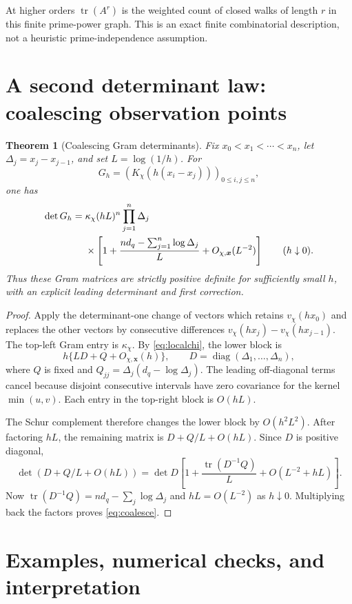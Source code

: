 \documentclass[11pt]{article}
\newtheorem{theorem}{Theorem}[section]
\theoremstyle{definition}
\newcommand{\tr}{\operatorname{tr}}
\newcommand{\diag}{\operatorname{diag}}
\newcommand{\kap}{\kappa}
\begin{document}
At higher orders $\tr(A^r)$ is the weighted count of closed walks of length
$r$ in this finite prime-power graph. This is an exact finite combinatorial
description, not a heuristic prime-independence assumption.

\section{A second determinant law: coalescing observation points}

\begin{theorem}[Coalescing Gram determinants]\label{thm:coalesce}
Fix $x_0<x_1<\cdots<x_n$, let $\Delta_j=x_j-x_{j-1}$, and set
$L=\log(1/h)$. For
\[
 G_h=(K_\chi(h(x_i-x_j)))_{0\le i,j\le n},
\]
one has
\begin{align}\label{eq:coalesce}
 \det G_h
 ={}&\kap_\chi(hL)^n\prod_{j=1}^n\Delta_j\notag\\
 &\times\left[1+
   \frac{n d_q-\sum_{j=1}^n\log\Delta_j}{L}
   +O_{\chi,\bm x}(L^{-2})\right]
 \qquad(h\downarrow0).
\end{align}
Thus these Gram matrices are strictly positive definite for sufficiently
small $h$, with an explicit leading determinant and first correction.
\end{theorem}

\begin{proof}
Apply the determinant-one change of vectors which retains $v_\chi(hx_0)$
and replaces the other vectors by consecutive differences
$v_\chi(hx_j)-v_\chi(hx_{j-1})$. The top-left Gram entry is $\kap_\chi$.
By \cref{eq:localchi}, the lower block is
\[
 h\{LD+Q+O_{\chi,\bm x}(h)\},\qquad
 D=\diag(\Delta_1,\ldots,\Delta_n),
\]
where $Q$ is fixed and
$Q_{jj}=\Delta_j(d_q-\log\Delta_j)$. The leading off-diagonal terms cancel
because disjoint consecutive intervals have zero covariance for the kernel
$\min(u,v)$. Each entry in the top-right block is $O(hL)$.

The Schur complement therefore changes the lower block by $O(h^2L^2)$.
After factoring $hL$, the remaining matrix is
$D+Q/L+O(hL)$. Since $D$ is positive diagonal,
\[
 \det(D+Q/L+O(hL))
 =\det D\left[1+\frac{\tr(D^{-1}Q)}L
              +O(L^{-2}+hL)\right].
\]
Now $\tr(D^{-1}Q)=nd_q-\sum_j\log\Delta_j$ and $hL=O(L^{-2})$ as
$h\downarrow0$. Multiplying back the factors proves \cref{eq:coalesce}.
\end{proof}

\section{Examples, numerical checks, and interpretation}
\end{document}
